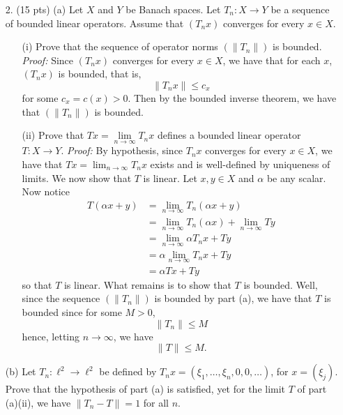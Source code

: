 \documentclass{article}
\begin{document}
\begin{itemize}
    \pagebreak
    \item[2.] (15 pts) (a) Let $X$ and $Y$ be Banach spaces. Let $T_n: X \to Y$ be a sequence of bounded linear operators. Assume that $(T_nx)$ converges for every $x \in X$. 
    \begin{itemize}
        \item[(i)] Prove that the sequence of operator norms $(\|T_n\|)$ is bounded.
        \newline\newline
        \textit{Proof:} Since $(T_nx)$ converges for every $x \in X$, we have that for each $x$, $(T_nx)$ is bounded, that is,
        \[\|T_nx\| \leq c_x\]
        for some $c_x = c(x) > 0$. Then by the bounded inverse theorem, we have that $(\|T_n\|)$ is bounded.

        \item[(ii)] Prove that $Tx = \underset{n\to \infty}{\lim} T_nx$ defines a bounded linear operator $T: X \to Y$. 
        \newline\newline
        \textit{Proof:} By hypothesis, since $T_nx$ converges for every $x \in X$, we have that $Tx = \lim_{n \to \infty} T_nx$ exists and is well-defined by uniqueness of limits. We now show that $T$ is linear. Let $x,y \in X$ and $\alpha$ be any scalar. Now notice
        \begin{align*}
            T(\alpha x + y) &= \lim_{n \to \infty} T_n(\alpha x + y)\\
            &= \lim_{n \to \infty} T_n(\alpha x) + \lim_{n \to \infty} Ty \tag{Linearity of Limits}\\
            &= \lim_{n \to \infty} \alpha T_nx + Ty \tag{Linearity of $T_n$}\\
            &= \alpha\lim_{n\to \infty} T_nx + Ty \tag{Linearity of Limits}\\
            &= \alpha Tx + Ty \tag{Def. of $T$}
        \end{align*}
        so that $T$ is linear. What remains is to show that $T$ is bounded. Well, since the sequence $(\|T_n\|)$ is bounded by part (a), we have that $T$ is bounded since for some $M > 0$, 
        \[\|T_n\| \leq M\]
        hence, letting $n \to \infty$, we have
        \[\|T\| \leq M.\]
    \end{itemize}
    (b) Let $T_n: \ell^2 \to \ell^2$ be defined by $T_nx = (\xi_1, \dots, \xi_n, 0, 0, \dots)$, for $x = (\xi_j)$. Prove that the hypothesis of part (a) is satisfied, yet for the limit $T$ of part (a)(ii), we have $\|T_n - T\| = 1$ for all $n$. 

\end{itemize}
\end{document}

